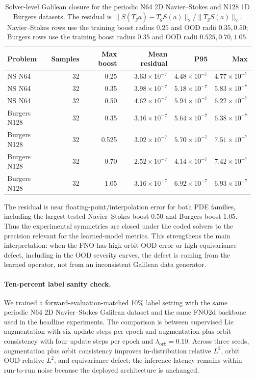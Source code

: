 \begin{table}[t]
\centering
\small
\caption{Solver-level Galilean closure for the periodic N64 2D Navier--Stokes and N128 1D Burgers datasets. The residual is \(\|S(T_g a)-T_gS(a)\|_2/\|T_gS(a)\|_2\). Navier--Stokes rows use the training boost radius \(0.25\) and OOD radii \(0.35,0.50\); Burgers rows use the training boost radius \(0.35\) and OOD radii \(0.525,0.70,1.05\).}
\label{tab:galilean-solver-closure}
\begin{tabular}{lrrrrr}
\toprule
Problem & Samples & Max boost & Mean residual & P95 & Max \\
\midrule
NS N64 & 32 & 0.25 & \(3.63\times10^{-7}\) & \(4.48\times10^{-7}\) & \(4.77\times10^{-7}\) \\
NS N64 & 32 & 0.35 & \(3.98\times10^{-7}\) & \(5.18\times10^{-7}\) & \(5.83\times10^{-7}\) \\
NS N64 & 32 & 0.50 & \(4.62\times10^{-7}\) & \(5.94\times10^{-7}\) & \(6.22\times10^{-7}\) \\
Burgers N128 & 32 & 0.35 & \(3.16\times10^{-7}\) & \(5.64\times10^{-7}\) & \(6.38\times10^{-7}\) \\
Burgers N128 & 32 & 0.525 & \(3.02\times10^{-7}\) & \(5.70\times10^{-7}\) & \(7.51\times10^{-7}\) \\
Burgers N128 & 32 & 0.70 & \(2.52\times10^{-7}\) & \(4.14\times10^{-7}\) & \(7.42\times10^{-7}\) \\
Burgers N128 & 32 & 1.05 & \(3.16\times10^{-7}\) & \(6.92\times10^{-7}\) & \(6.93\times10^{-7}\) \\
\bottomrule
\end{tabular}
\end{table}

The residual is near floating-point/interpolation error for both PDE families, including the largest tested Navier--Stokes boost \(0.50\) and Burgers boost \(1.05\). Thus the experimental symmetries are closed under the coded solvers to the precision relevant for the learned-model metrics. This strengthens the main interpretation: when the FNO has high orbit OOD error or high equivariance defect, including in the OOD severity curves, the defect is coming from the learned operator, not from an inconsistent Galilean data generator.

\paragraph{Ten-percent label sanity check.} We trained a forward-evaluation-matched 10\% label setting with the same periodic N64 2D Navier--Stokes Galilean dataset and the same FNO2d backbone used in the headline experiments. The comparison is between supervised Lie augmentation with six update steps per epoch and augmentation plus orbit consistency with four update steps per epoch and \(\lambda_{\mathrm{orb}}=0.10\). Across three seeds, augmentation plus orbit consistency improves in-distribution relative \(L^2\), orbit OOD relative \(L^2\), and equivariance defect; the inference latency remains within run-to-run noise because the deployed architecture is unchanged.

